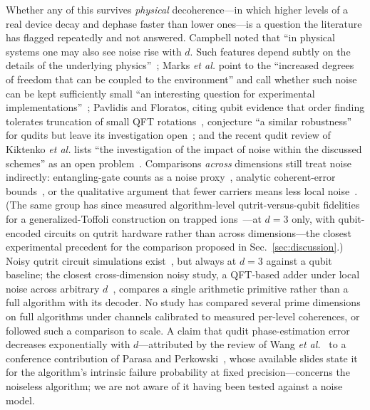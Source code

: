 \documentclass[aps,pra,reprint,superscriptaddress,nofootinbib,floatfix]{revtex4-2}
\begin{document}
Whether any of this survives \emph{physical} decoherence---in which
higher levels of a real device decay and dephase faster than lower
ones---is a question the literature has flagged repeatedly and not
answered. Campbell noted that ``in physical systems one may also see
noise rise with $d$. Such features depend subtly on the details of the
underlying physics''~\cite{campbell2014}; Marks \emph{et al.} point to
the ``increased degrees of freedom that can be coupled to the
environment'' and call whether such noise can be kept sufficiently
small ``an interesting question for experimental
implementations''~\cite{marks2017}; Pavlidis and Floratos, citing qubit
evidence that order finding tolerates truncation of small QFT
rotations~\cite{barenco1996,nam2012}, conjecture ``a similar
robustness'' for qudits but leave its investigation
open~\cite{pavlidis2021}; and the recent qudit review of Kiktenko
\emph{et al.} lists ``the investigation of the impact of noise within
the discussed schemes'' as an open problem~\cite{kiktenko2025}.
Comparisons \emph{across} dimensions still treat noise indirectly:
entangling-gate counts as a noise
proxy~\cite{nikolaeva2024,kiktenko2025}, analytic coherent-error
bounds~\cite{bocharov2017}, or the qualitative argument that fewer
carriers means less local noise~\cite{wang2020}. (The same group has
since measured algorithm-level qutrit-versus-qubit fidelities for a
generalized-Toffoli construction on trapped
ions~\cite{nikolaeva2024toffoli}---at $d=3$ only, with qubit-encoded
circuits on qutrit hardware rather than across dimensions---the
closest experimental precedent for the comparison proposed in
Sec.~\ref{sec:discussion}.) Noisy qutrit circuit
simulations exist~\cite{gokhale2019,gustafson2022}, but always at
$d=3$ against a qubit baseline; the closest cross-dimension noisy
study, a QFT-based adder under local noise across arbitrary
$d$~\cite{agrawal2025}, compares a single arithmetic primitive rather
than a full algorithm with its decoder. No study has compared several
prime dimensions on full algorithms under channels calibrated to
measured per-level coherences, or followed such a comparison to scale. A claim
that qudit phase-estimation error decreases exponentially with
$d$---attributed by the review of Wang \emph{et
al.}~\cite{wang2020} to a conference contribution of Parasa and
Perkowski~\cite{parasa2011}, whose available slides state it for the
algorithm's intrinsic failure probability at fixed
precision---concerns the noiseless algorithm; we are not aware of it
having been tested against a noise model.
\end{document}
